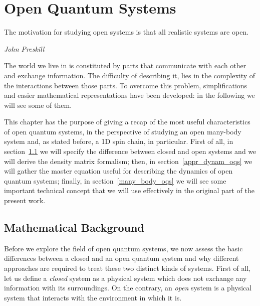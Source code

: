 \chapter{Open Quantum Systems}
\label{Chapter1}
\epigraph{The motivation for studying open systems is that all realistic systems are open.}{\textit{John Preskill}}

\newcommand{\keyword}[1]{\textbf{#1}}
\newcommand{\tabhead}[1]{\textbf{#1}}
\newcommand{\code}[1]{\texttt{#1}}
\newcommand{\file}[1]{\texttt{\bfseries#1}}
\newcommand{\option}[1]{\texttt{\itshape#1}}

The world we live in is constituted by parts that communicate with each other and exchange information. The difficulty of describing it, lies in the complexity of the interactions between those parts. To overcome this problem, simplifications and easier mathematical representations have been developed: in the following we will see some of them.

This chapter has the purpose of giving a recap of the most useful characteristics of open quantum systems, in the perspective of studying an open many-body system and, as stated before, a 1D spin chain, in particular. First of all, in section~\ref{cl_open_qs} we will specify the difference between closed and open systems and we will derive the density matrix formalism; then, in section~\ref{appr_dynam_oqs} we will gather the master equation useful for describing the dynamics of open quantum systems; finally, in section~\ref{many_body_oqs} we will see some important technical concept that we will use effectively in the original part of the present work.


\section{Mathematical Background}
\label{cl_open_qs}
Before we explore the field of open quantum systems, we now assess the basic differences between a closed and an open quantum system and why different approaches are required to treat these two distinct kinds of systems. First of all, let us define a \emph{closed} system as a physical system which does not exchange any information with its surroundings. On the contrary, an \emph{open} system is a physical system that interacts with the environment in which it is. 

